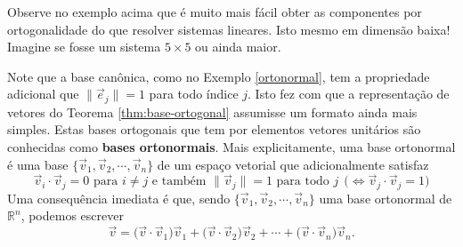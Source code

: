 \documentclass[../livro.tex]{subfiles}  %
\begin{document}
Observe no exemplo acima que é muito mais fácil obter as componentes por ortogonalidade do que resolver sistemas lineares. Isto mesmo em dimensão baixa! Imagine se fosse um sistema $5\times 5$ ou ainda maior.


Note que a base canônica, como no Exemplo \ref{ortonormal}, tem a propriedade adicional que $\|\vec{e}_j\| = 1$ para todo índice $j$. Isto fez com que a representação de vetores do Teorema \ref{thm:base-ortogonal} assumisse um formato ainda mais simples. Estas bases ortogonais que tem por elementos vetores unitários são conhecidas como \textbf{bases ortonormais}. Mais explicitamente, uma base ortonormal é uma base $\{\vec{v}_1, \vec{v}_2, \cdots, \vec{v}_n\}$ de um espaço vetorial que adicionalmente satisfaz
\begin{equation}
\vec{v}_i \cdot \vec{v}_j = 0 \text{ para } i \neq j \text{ e também } \|\vec{v}_j\| = 1 \text{ para todo } j \ \ \big( \iff \vec{v}_j \cdot \vec{v}_j = 1 \big)
\end{equation} Uma consequência imediata é que, sendo $\{\vec{v}_1, \vec{v}_2, \cdots, \vec{v}_n\}$ uma base ortonormal de $\mathbb{R}^n$, podemos escrever
\begin{equation}
\vec{v} = \big( \vec{v} \cdot \vec{v}_1 \big) \vec{v}_1 + \big( \vec{v} \cdot \vec{v}_2 \big) \vec{v}_2  + \cdots + \big( \vec{v} \cdot \vec{v}_n \big) \vec{v}_n.
\end{equation}
\end{document}
